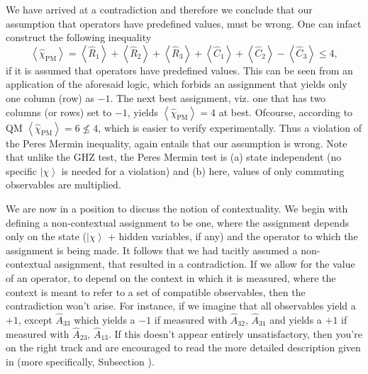We have arrived at a contradiction and therefore we conclude that
our assumption that operators have predefined values, must be wrong.
One can infact construct the following inequality 
\[
\left\langle \hat{\chi}_{\text{PM}}\right\rangle =\left\langle \hat{R}_{1}\right\rangle +\left\langle \hat{R}_{2}\right\rangle +\left\langle \hat{R}_{3}\right\rangle +\left\langle \hat{C}_{1}\right\rangle +\left\langle \hat{C}_{2}\right\rangle -\left\langle \hat{C}_{3}\right\rangle \le4,
\]
if it is assumed that operators have predefined values. This can be
seen from an application of the aforesaid logic, which forbids an
assignment that yields only one column (row) as $-1$. The next best
assignment, viz. one that has two columns (or rows) set to $-1$,
yields $\left\langle \hat{\chi}_{\text{PM}}\right\rangle =4$ at best.
Ofcourse, according to QM $\left\langle \hat{\chi}_{\text{PM}}\right\rangle =6\nleq4$,
which is easier to verify experimentally. Thus a violation of the
Peres Mermin inequality, again entails that our assumption is wrong.
Note that unlike the GHZ test, the Peres Mermin test is (a) state
independent (no specific $\left|\chi\right\rangle $ is needed for
a violation) and (b) here, values of only commuting observables are
multiplied.

We are now in a position to discuss the notion of contextuality. We
begin with defining a non-contextual assignment to be one, where the
assignment depends only on the state ($\left|\chi\right\rangle $
+ hidden variables, if any) and the operator to which the assignment
is being made. It follows that we had tacitly assumed a non-contextual
assignment, that resulted in a contradiction. If we allow for the
value of an operator, to depend on the context in which it is measured,
where the context is meant to refer to a set of compatible observables,
then the contradiction won't arise. For instance, if we imagine that
all observables yield a $+1$, except $\hat{A}_{33}$ which yields
a $-1$ if measured with $\hat{A}_{32},\,\hat{A}_{31}$ and yields
a $+1$ if measured with $\hat{A}_{23},\,\hat{A}_{13}$. If this doesn't
appear entirely unsatisfactory, then you're on the right track and
are encouraged to read the more detailed description given in 
(more specifically, Subsection ).%

